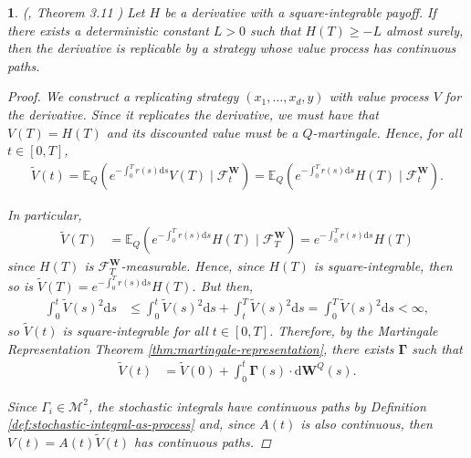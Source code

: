 \documentclass[english]{article}
\numberwithin{equation}{section}
\numberwithin{figure}{section}
\theoremstyle{bolddescit}
\newtheorem{theorem}{\protect\theoremname}[section]
\theoremstyle{definition}
\theoremstyle{definition}
\theoremstyle{plain}
\theoremstyle{plain}
\theoremstyle{bolddesc}
\theoremstyle{plain}
\theoremstyle{remark}
\providecommand{\theoremname}{Theorem}
\begin{document}
\begin{theorem}\label{thm:bs-replicability}
  (\cite{capinski_blackscholes_2012}, Theorem 3.11 )
  Let $H$ be a derivative with a square-integrable payoff. If there exists a deterministic constant $L > 0$ such that $H(T) \ge -L$ almost surely, then the derivative is replicable by a strategy whose value process has continuous paths.

  \begin{proof}
    We construct a replicating strategy $(x_1,\ldots,x_d,y)$ with value process $V$ for the derivative. Since it replicates the derivative, we must have that $V(T) = H(T)$ and its discounted value must be a $Q$-martingale. Hence, for all $t \in [0,T]$,
    \begin{align*}
      \widetilde{V}(t)
      = \mathbb{E}_Q\left(e^{-\int_0^T r(s) \mathrm{d}s} V(T) \mid \mathcal{F}^\mathbf{W}_t\right)
      = \mathbb{E}_Q\left(e^{-\int_0^T r(s) \mathrm{d}s} H(T) \mid \mathcal{F}^\mathbf{W}_t\right).
    \end{align*}

    In particular,
    \begin{align*}
      \widetilde{V}(T)
      &= \mathbb{E}_Q\left(e^{-\int_0^T r(s)\mathrm{d}s} H(T) \mid \mathcal{F}^\mathbf{W}_T\right)
      = e^{-\int_0^T r(s)\mathrm{d}s} H(T)
    \end{align*}
    since $H(T)$ is $\mathcal{F}^\mathbf{W}_T$-measurable. Hence, since $H(T)$ is square-integrable, then so is $\widetilde{V}(T) = e^{-\int_0^T r(s)\mathrm{d}s} H(T)$. But then,
    \begin{align*}
      \int_0^t \widetilde{V}(s)^2 \mathrm{d}s
      &\le \int_0^t \widetilde{V}(s)^2 \mathrm{d}s + \int_t^T \widetilde{V}(s)^2 \mathrm{d}s
      = \int_0^T \widetilde{V}(s)^2 \mathrm{d}s < \infty,
    \end{align*}
    so $\widetilde{V}(t)$ is square-integrable for all $t \in [0,T]$. Therefore, by the Martingale Representation Theorem \ref{thm:martingale-representation}, there exists $\mathbf{\Gamma}$ such that
    \begin{align}\label{eq:bs-repl-deriv-gamma}
      \widetilde{V}(t)
      &= \widetilde{V}(0) + \int_0^t \mathbf{\Gamma}(s) \cdot \mathrm{d}\mathbf{W}^Q(s).
    \end{align}

    Since $\Gamma_i \in \mathcal{M}^2$, the stochastic integrals have continuous paths by Definition \ref{def:stochastic-integral-as-process} and, since $A(t)$ is also continuous, then $V(t) = A(t) \widetilde{V}(t)$ has continuous paths.


\end{proof}
\end{theorem}
\end{document}
